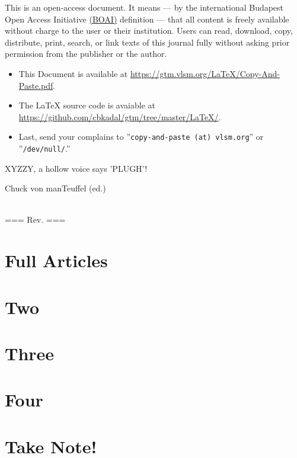 \documentclass[12pt]{book}
\newcommand{\pengarangs}{%
    Chuck von manTeuffel (ed.)
}
\begin{document}
This is an open-access document.
It means 
--- by the international Budapest Open Access Initiative 
\href{https://www.budapestopenaccessinitiative.org/}{(BOAI)}
definition --- that all content is freely available without charge to the user or their institution.
Users can read, download, copy, distribute, print, search, 
or link texts of this journal fully without asking prior permission from the publisher or the author.

\begin{itemize}
\item This Document is available at \url{https://gtm.vlsm.org/LaTeX/Copy-And-Paste.pdf}.
\item The \LaTeX{} source code is avaiable at \url{https://github.com/cbkadal/gtm/tree/master/LaTeX/}.
\item Last, send your complains to ''\texttt{copy-and-paste (at) vlsm.org}'' or ''\texttt{/dev/null/}.''
\end{itemize}

XYZZY, a hollow voice says 'PLUGH'!

\noindent
\pengarangs
\\[6pt]
\noindent
=== \smallskip Rev. \rev{} \medskip \smallskip ===

\newpage


\part{Full Articles}

\part{Two}

\part{Three}

\part{Four}

\part{Take Note!}


\end{document}

